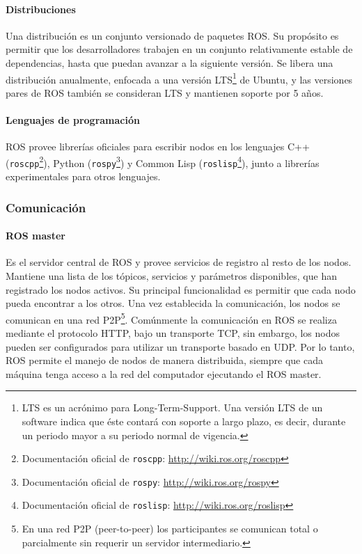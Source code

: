 \paragraph{Distribuciones} 
Una distribución es un conjunto versionado de paquetes ROS. Su propósito es permitir que los desarrolladores trabajen en un conjunto relativamente estable de dependencias, hasta que puedan avanzar a la siguiente versión. Se libera una distribución anualmente, enfocada a una versión  LTS\footnote{LTS es un acrónimo para Long-Term-Support. Una versión LTS de un software indica que éste contará con soporte a largo plazo, es decir, durante un periodo mayor a su periodo normal de vigencia.} de Ubuntu, y las versiones pares de ROS también se consideran LTS y mantienen soporte por 5 años.

\paragraph{Lenguajes de programación} ROS provee librerías oficiales para escribir nodos en los lenguajes C++ (\texttt{roscpp}\footnote{Documentación oficial de \texttt{roscpp}: \url{http://wiki.ros.org/roscpp}}), Python (\texttt{rospy}\footnote{Documentación oficial de \texttt{rospy}: \url{http://wiki.ros.org/rospy}}) y Common Lisp (\texttt{roslisp}\footnote{Documentación oficial de \texttt{roslisp}: \url{http://wiki.ros.org/roslisp}}), junto a librerías experimentales para otros lenguajes.

\subsubsection{Comunicación}

\paragraph{ROS master} Es el servidor central de ROS y provee servicios de registro al resto de los nodos. Mantiene una lista de los tópicos, servicios y parámetros disponibles, que han registrado los nodos activos. Su principal funcionalidad es permitir que cada nodo pueda encontrar a los otros. Una vez establecida la comunicación, los nodos se comunican en una red P2P\footnote{En una red P2P (peer-to-peer) los participantes se comunican total o parcialmente sin requerir un servidor intermediario.}. Comúnmente la comunicación en ROS se realiza mediante el protocolo HTTP, bajo un transporte TCP, sin embargo, los nodos pueden ser configurados para utilizar un transporte basado en UDP. Por lo tanto, ROS permite el manejo de nodos de manera distribuida, siempre que cada máquina tenga acceso a la red del computador ejecutando el ROS master.

